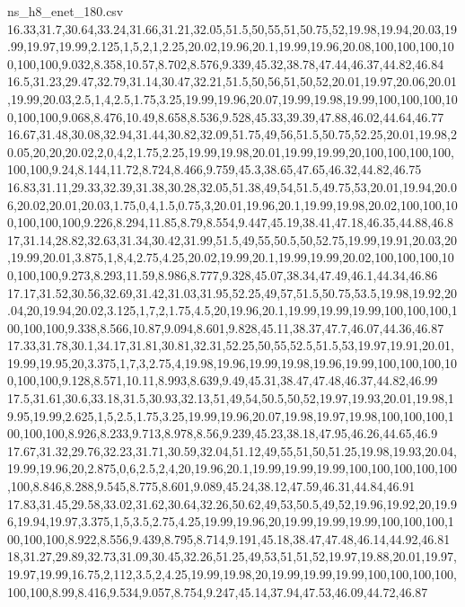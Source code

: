 \begin{filecontents*}[overwrite]{ns_h8_enet_180.csv}
16.33,31.7,30.64,33.24,31.66,31.21,32.05,51.5,50,55,51,50.75,52,19.98,19.94,20.03,19.99,19.97,19.99,2.125,1,5,2,1,2.25,20.02,19.96,20.1,19.99,19.96,20.08,100,100,100,100,100,100,9.032,8.358,10.57,8.702,8.576,9.339,45.32,38.78,47.44,46.37,44.82,46.84
16.5,31.23,29.47,32.79,31.14,30.47,32.21,51.5,50,56,51,50,52,20.01,19.97,20.06,20.01,19.99,20.03,2.5,1,4,2.5,1.75,3.25,19.99,19.96,20.07,19.99,19.98,19.99,100,100,100,100,100,100,9.068,8.476,10.49,8.658,8.536,9.528,45.33,39.39,47.88,46.02,44.64,46.77
16.67,31.48,30.08,32.94,31.44,30.82,32.09,51.75,49,56,51.5,50.75,52.25,20.01,19.98,20.05,20,20,20.02,2,0,4,2,1.75,2.25,19.99,19.98,20.01,19.99,19.99,20,100,100,100,100,100,100,9.24,8.144,11.72,8.724,8.466,9.759,45.3,38.65,47.65,46.32,44.82,46.75
16.83,31.11,29.33,32.39,31.38,30.28,32.05,51.38,49,54,51.5,49.75,53,20.01,19.94,20.06,20.02,20.01,20.03,1.75,0,4,1.5,0.75,3,20.01,19.96,20.1,19.99,19.98,20.02,100,100,100,100,100,100,9.226,8.294,11.85,8.79,8.554,9.447,45.19,38.41,47.18,46.35,44.88,46.8
17,31.14,28.82,32.63,31.34,30.42,31.99,51.5,49,55,50.5,50,52.75,19.99,19.91,20.03,20,19.99,20.01,3.875,1,8,4,2.75,4.25,20.02,19.99,20.1,19.99,19.99,20.02,100,100,100,100,100,100,9.273,8.293,11.59,8.986,8.777,9.328,45.07,38.34,47.49,46.1,44.34,46.86
17.17,31.52,30.56,32.69,31.42,31.03,31.95,52.25,49,57,51.5,50.75,53.5,19.98,19.92,20.04,20,19.94,20.02,3.125,1,7,2,1.75,4.5,20,19.96,20.1,19.99,19.99,19.99,100,100,100,100,100,100,9.338,8.566,10.87,9.094,8.601,9.828,45.11,38.37,47.7,46.07,44.36,46.87
17.33,31.78,30.1,34.17,31.81,30.81,32.31,52.25,50,55,52.5,51.5,53,19.97,19.91,20.01,19.99,19.95,20,3.375,1,7,3,2.75,4,19.98,19.96,19.99,19.98,19.96,19.99,100,100,100,100,100,100,9.128,8.571,10.11,8.993,8.639,9.49,45.31,38.47,47.48,46.37,44.82,46.99
17.5,31.61,30.6,33.18,31.5,30.93,32.13,51,49,54,50.5,50,52,19.97,19.93,20.01,19.98,19.95,19.99,2.625,1,5,2.5,1.75,3.25,19.99,19.96,20.07,19.98,19.97,19.98,100,100,100,100,100,100,8.926,8.233,9.713,8.978,8.56,9.239,45.23,38.18,47.95,46.26,44.65,46.9
17.67,31.32,29.76,32.23,31.71,30.59,32.04,51.12,49,55,51,50,51.25,19.98,19.93,20.04,19.99,19.96,20,2.875,0,6,2.5,2,4,20,19.96,20.1,19.99,19.99,19.99,100,100,100,100,100,100,8.846,8.288,9.545,8.775,8.601,9.089,45.24,38.12,47.59,46.31,44.84,46.91
17.83,31.45,29.58,33.02,31.62,30.64,32.26,50.62,49,53,50.5,49,52,19.96,19.92,20,19.96,19.94,19.97,3.375,1,5,3.5,2.75,4.25,19.99,19.96,20,19.99,19.99,19.99,100,100,100,100,100,100,8.922,8.556,9.439,8.795,8.714,9.191,45.18,38.47,47.48,46.14,44.92,46.81
18,31.27,29.89,32.73,31.09,30.45,32.26,51.25,49,53,51,51,52,19.97,19.88,20.01,19.97,19.97,19.99,16.75,2,112,3.5,2,4.25,19.99,19.98,20,19.99,19.99,19.99,100,100,100,100,100,100,8.99,8.416,9.534,9.057,8.754,9.247,45.14,37.94,47.53,46.09,44.72,46.87

\end{filecontents*}
